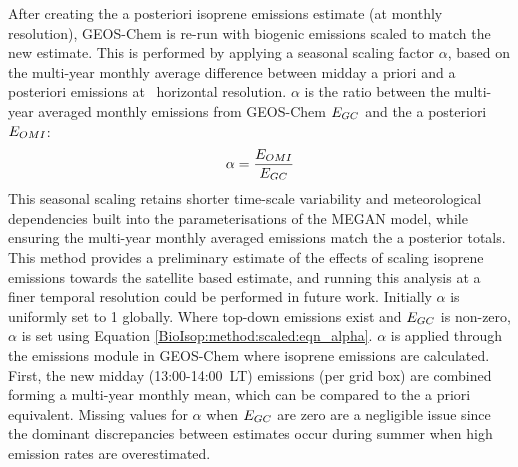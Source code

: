     After creating the a posteriori isoprene emissions estimate (at monthly resolution), GEOS-Chem is re-run with biogenic emissions scaled to match the new estimate. 
    This is performed by applying a seasonal scaling factor $\alpha$, based on the multi-year monthly average difference between midday a priori and a posteriori emissions at \lowhr ~horizontal resolution.
    $\alpha$ is the ratio between the multi-year averaged monthly emissions from GEOS-Chem $E_{GC}$ and the a posteriori $E_{OMI}$: 
    \begin{equation} \label{BioIsop:method:scaled:eqn_alpha}
        \alpha = \frac{E_{OMI}}{E_{GC}}
    \end{equation}
    This seasonal scaling retains shorter time-scale variability and meteorological dependencies built into the parameterisations of the MEGAN model, while ensuring the multi-year monthly averaged emissions match the a posterior totals.
    This method provides a preliminary estimate of the effects of scaling isoprene emissions towards the satellite based estimate, and running this analysis at a finer temporal resolution could be performed in future work.
    Initially $\alpha$ is uniformly set to 1 globally.
    Where top-down emissions exist and $E_{GC}$ is non-zero, $\alpha$ is set using Equation \ref{BioIsop:method:scaled:eqn_alpha}.
    $\alpha$ is applied through the emissions module in GEOS-Chem where isoprene emissions are calculated.
    First, the new midday (13:00-14:00~LT) emissions (per grid box) are combined forming a multi-year monthly mean, which can be compared to the a priori equivalent.
    Missing values for $\alpha$ when $E_{GC}$ are zero are a negligible issue since the dominant discrepancies between estimates occur during summer when high emission rates are overestimated.
    

